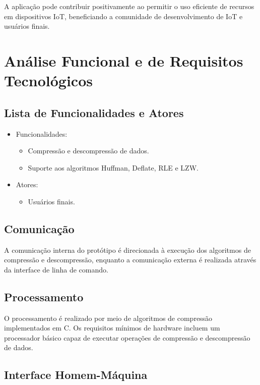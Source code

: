 A aplicação pode contribuir positivamente ao permitir o uso eficiente de recursos em dispositivos IoT, beneficiando a comunidade de desenvolvimento de IoT e usuários finais.

\section{Análise Funcional e de Requisitos Tecnológicos}

\subsection{Lista de Funcionalidades e Atores}

\begin{itemize}
    \item Funcionalidades:
        \begin{itemize}
            \item Compressão e descompressão de dados.
            \item Suporte aos algoritmos Huffman, Deflate, RLE e LZW.
        \end{itemize}
    \item Atores:
        \begin{itemize}
            \item Usuários finais.
        \end{itemize}
\end{itemize}

\subsection{Comunicação}

A comunicação interna do protótipo é direcionada à execução dos algoritmos de compressão e descompressão, enquanto a comunicação externa é realizada através da interface de linha de comando.

\subsection{Processamento}

O processamento é realizado por meio de algoritmos de compressão implementados em C. Os requisitos mínimos de hardware incluem um processador básico capaz de executar operações de compressão e descompressão de dados.

\subsection{Interface Homem-Máquina}

